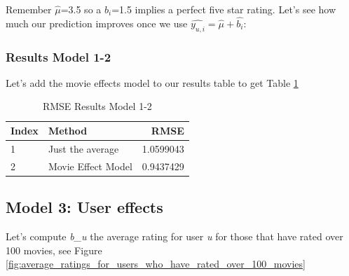 \documentclass[
]{article}
\newenvironment{Shaded}{}{}
\newcommand{\AttributeTok}[1]{\textcolor[rgb]{0.49,0.56,0.16}{#1}}
\newcommand{\DecValTok}[1]{\textcolor[rgb]{0.25,0.63,0.44}{#1}}
\newcommand{\FloatTok}[1]{\textcolor[rgb]{0.25,0.63,0.44}{#1}}
\newcommand{\FunctionTok}[1]{\textcolor[rgb]{0.02,0.16,0.49}{#1}}
\newcommand{\NormalTok}[1]{#1}
\newcommand{\OtherTok}[1]{\textcolor[rgb]{0.00,0.44,0.13}{#1}}
\newcommand{\SpecialCharTok}[1]{\textcolor[rgb]{0.25,0.44,0.63}{#1}}
\newcommand{\StringTok}[1]{\textcolor[rgb]{0.25,0.44,0.63}{#1}}
\begin{document}
Remember \(\hat{\mu}\)=3.5 so a \(b_{i}\)=1.5 implies a perfect five
star rating. Let's see how much our prediction improves once we use
\(\hat{y_{u,i}}=\hat{\mu}+\hat{b_{i}}\):

\begin{Shaded}
\end{Shaded}

\newpage

\hypertarget{results-model-1-2}{%
\subsubsection{Results Model 1-2}\label{results-model-1-2}}

Let's add the movie effects model to our results table to get Table
\ref{tbl:rmse_results_model_1-2}

\begin{table}[H]

\caption{\label{tab:m_2_5}RMSE Results Model 1-2\label{tbl:rmse_results_model_1-2}}
\centering
\fontsize{7}{9}\selectfont
\begin{tabular}[t]{llr}
\toprule
Index & Method & RMSE\\
\midrule
1 & Just the average & 1.0599043\\
2 & Movie Effect Model & 0.9437429\\
\bottomrule
\end{tabular}
\end{table}

\newpage

\hypertarget{model-3-user-effects}{%
\subsection{Model 3: User effects}\label{model-3-user-effects}}

Let's compute \emph{b\_u} the average rating for user \emph{u} for those
that have rated over 100 movies, see Figure
\ref{fig:average_ratings_for_users_who_have_rated_over_100_movies}
\end{document}
